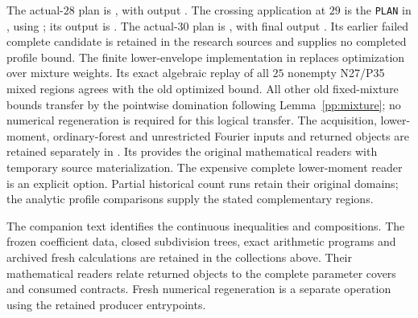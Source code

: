 \documentclass[aop,preprint]{imsart}
\theoremstyle{definition}
\numberwithin{equation}{section}
\begin{document}
The actual-$28$ plan is
, with output
.
The crossing application at $29$ is the \texttt{PLAN} in
, using
; its output is
.
The actual-$30$ plan is
, with final output
.
Its earlier failed complete candidate is retained in the research
sources and supplies no completed profile bound.
The finite lower-envelope implementation in
 replaces optimization
over mixture weights. Its exact algebraic replay of all $25$ nonempty
N27/P35 mixed regions agrees with the old optimized bound. All other
old fixed-mixture bounds transfer by the pointwise domination following
Lemma~\ref{pp:mixture}; no numerical regeneration is required for this
logical transfer.
The acquisition, lower-moment, ordinary-forest and unrestricted
Fourier inputs and returned objects are retained separately in
. Its
 provides the original mathematical
readers with temporary source materialization. The expensive complete
lower-moment reader is an explicit option. Partial historical count
runs retain their original domains; the analytic profile comparisons
supply the stated complementary regions.

The companion text identifies the continuous inequalities and compositions.
The frozen coefficient data, closed subdivision trees, exact arithmetic
programs and archived fresh calculations are retained in the collections
above. Their mathematical readers relate returned objects to the complete
parameter covers and consumed contracts. Fresh numerical regeneration
is a separate operation using the retained producer entrypoints.
\end{document}
